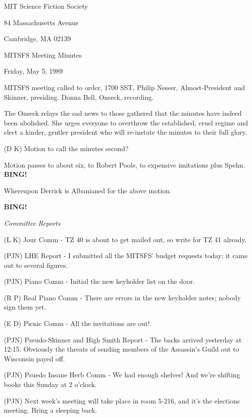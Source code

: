 \documentclass[12pt]{article}
\newcommand{\bing}{{\bf BING!} }
\newcommand{\goto}[1]{\bing \vskip 12pt \centerline{{\em{#1}}}}
\begin{document}
\begin{center}

MIT Science Fiction Society 

84 Massachusetts Avenue

Cambridge, MA 02139

\vspace{12pt}

MITSFS Meeting Minutes 

Friday, May 5, 1989

\end{center}
 
\vspace{18pt}

\setlength{\parskip}{6pt}

\noindent
MITSFS meeting called to order, 1700 SST, Philip Nesser, Almost-President and Skinner, presiding. Donna Bell, Onseck, recording.

The Onseck relays the sad news to those gathered that the minutes have indeed been abolished.  She urges everyone to overthrow the established, cruel regime and elect a kinder, gentler president who will re-instate the minutes to their full glory.

(D K) Motion to call the minutes second?

Motion passes to about six, to Robert Poole, to expensive imitations plus Spehn. \bing

Whereupon Derrick is Albanianed for the above motion.

\goto{Committee Reports}

(L K) Jour Comm - TZ 40 is about to get mailed out, so write for TZ 41 already.

(PJN) LHE Report - I submitted all the MITSFS' budget requests today; it came out to several figures.

(PJN) Piano Comm - Initial the new keyholder list on the door.

(R P) Real Piano Comm - There are errors in the new keyholder notes; nobody sign them yet.

(E D) Picnic Comm - All the invitations are out!

(PJN) Pseudo-Skinner and High Smith Report - The backs arrived yesterday at 12:15. Obviously the threats of sending members of the Assassin's Guild out to Wisconsin payed off.

(PJN) Psuedo Insane Herb Comm - We had enough shelves! And we're shifting books this Sunday at 2 o'clock.

(PJN) Next week's meeting will take place in room 5-216, and it's the elections meeting. Bring a sleeping back.
\end{document}
